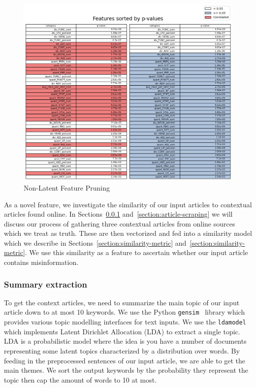 \documentclass{article}
\begin{document}
\begin{figure}[H]
  \centering
  \includegraphics[width=\textwidth]{img/non_latent_feat_prune.png}
  \caption{Non-Latent Feature Pruning}
  \label{fig:non-latent-feat-prune}
\end{figure}


As a novel feature, we investigate the similarity of our input articles to contextual articles found online. In Sections~\ref{section:summary-extraction} and~\ref{section:article-scraping} we will discuss our process of gathering three contextual articles from online sources which we treat as truth. These are then vectorized and fed into a similarity model which we describe in Sections~\ref{section:similarity-metric} and~\ref{section:similarity-metric}. We use this similarity as a feature to ascertain whether our input article contains misinformation.

\subsubsection{Summary extraction} \label{section:summary-extraction}

To get the context articles, we need to summarize the main topic of our input article down to at most 10 keywords. We use the Python \verb|gensim|~\cite{py-gensim} library which provides various topic modelling interfaces for text inputs. We use the \verb|ldamodel| which implements Latent Dirichlet Allocation (LDA) to extract a single topic. LDA is a probabilistic model where the idea is you have a number of documents representing some latent topics characterized by a distribution over words. By feeding in the preprocessed sentences of our input article, we are able to get the main themes. We sort the output keywords by the probability they represent the topic then cap the amount of words to 10 at most.
\end{document}
